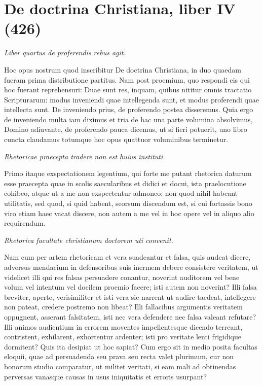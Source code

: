 
\section*{De doctrina Christiana, liber IV (426)}

\textit{Liber quartus de proferendis rebus agit.}

Hoc opus nostrum quod inscribitur De doctrina Christiana, in duo quaedam fueram prima distributione partitus. Nam post proemium, quo respondi eis qui hoc fuerant reprehensuri: Duae sunt res, inquam, quibus nititur omnis tractatio Scripturarum: modus inveniendi quae intellegenda sunt, et modus proferendi quae intellecta sunt. De inveniendo prius, de proferendo postea disseremus. Quia ergo de inveniendo multa iam diximus et tria de hac una parte volumina absolvimus, Domino adiuvante, de proferendo pauca dicemus, ut si fieri potuerit, uno libro cuncta claudamus totumque hoc opus quattuor voluminibus terminetur.

\textit{Rhetoricae praecepta tradere non est huius instituti.}

Primo itaque exspectationem legentium, qui forte me putant rhetorica daturum esse praecepta quae in scolis saecularibus et didici et docui, ista praelocutione cohibeo, atque ut a me non exspectentur admoneo; non quod nihil habeant utilitatis, sed quod, si quid habent, seorsum discendum est, si cui fortassis bono viro etiam haec vacat discere, non autem a me vel in hoc opere vel in aliquo alio requirendum.

\textit{Rhetorica facultate christianum doctorem uti convenit.}

Nam cum per artem rhetoricam et vera suadeantur et falsa, quis audeat dicere, adversus mendacium in defensoribus suis inermem debere consistere veritatem, ut videlicet illi qui res falsas persuadere conantur, noverint auditorem vel bene volum vel intentum vel docilem proemio facere; isti autem non noverint? Illi falsa breviter, aperte, verisimiliter et isti vera sic narrent ut audire taedeat, intellegere non pateat, credere postremo non libeat? Illi fallacibus argumentis veritatem oppugnent, asserant falsitatem, isti nec vera defendere nec falsa valeant refutare? Illi animos audientium in errorem moventes impellentesque dicendo terreant, contristent, exhilarent, exhortentur ardenter; isti pro veritate lenti frigidique dormitent? Quis ita desipiat ut hoc sapiat? Cum ergo sit in medio posita facultas eloquii, quae ad persuadenda seu prava seu recta valet plurimum, cur non bonorum studio comparatur, ut militet veritati, si eam mali ad obtinendas perversas vanasque causas in usus iniquitatis et erroris usurpant?

